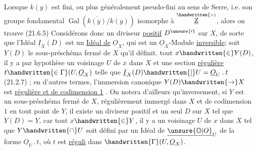 Lorsque $k(y)$ est fini, ou plus généralement pseudo-fini au sens de Serre, i.e. son groupe fondamental $\operatorname{Gal}(\overline{k(y)}/k(y))$ isomorphe à $\overset{\handwritten{\scriptscriptstyle\wedge}}{\underline{\mathrm Z}}$, alors on trouve
\clearpage
{}
(21.6.5) Considérons donc un diviseur \uline{positif} $D^{\unsure{\prime}}$ sur $X$, de sorte que l'Idéal  $\underline I_{X}(D)$ est un \uline{Idéal de} $\underline O_{X}$, qui est un $\underline O_{X}$-Module \uline{inversible}; soit $Y(D)$ le sous-préschéma fermé de $X$ qu'il définit.   tout $x\handwritten{\in}Y(D)$,  il y a par hypothèse un voisinage  $U$ de $x$ dans $X$ et une section \uline{régulière} $t\handwritten{\in\Gamma}(U,\underline O_{X})$ telle que $\underline I_{X}(D)\handwritten{\mid}U=\underline O_{U}\mathbin{.}t$ (21.2.7) ; en d'autres termes, l'immersion canonique $Y(D)\handwritten{\to}X$ est \uline{régulière et de codimension 1} . On notera d'ailleurs qu'inversement, si $Y$ \reversemarginpar
est un sous-préschéma fermé de $X$, régulièrement immergé dans $X$ et  de codimension $1$ en tout point de $Y$, il existe un diviseur positif et un seul  $D$ sur $X$ tel que $Y(D)=Y$, car  tout $x\handwritten{\in}Y$, il y a un voisinage $U$ de $x$ dans $X$ tel que $Y\handwritten{\cap}U$ soit défini par un Idéal de $\underline{\unsure{\mathbb O|O}}_{U}$ de la forme $\underline O_{U}\mathbin{.}t$, où $t$ est \uline{réguli} dans $\handwritten{\Gamma}(U,\underline O_{X})$.


